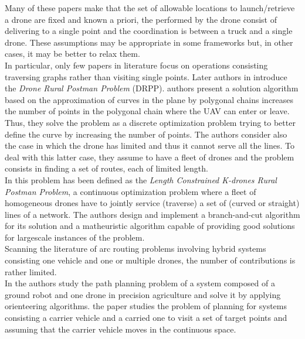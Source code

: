 \noindent
Many of these papers make  that the set of allowable locations to launch/retrieve a drone are fixed and known a priori, the  performed by the drone consist of delivering to a single point and the coordination is between a truck and a single drone. These assumptions may be appropriate in some frameworks\RE{,} but, in other cases, it may be better to relax them.\\
\noindent
In particular, only  few papers in  literature focus on  operations consisting  traversing graphs rather than visiting single points. Later authors in 
\cite{art:Campbell2018} introduce the \textit{Drone Rural Postman Problem} (DRPP).  authors present a solution algorithm based on the approximation of curves in the plane by polygonal chains  increases the number of points in the polygonal chain where the UAV can enter or leave. Thus, they solve the problem as a discrete optimization problem trying to better define the curve by increasing the number of points. The authors consider also the case in which the drone has limited  and thus it cannot serve all the lines. To deal with this latter case, they assume to have a fleet of drones and the problem consists in finding a set of routes, each of limited length.\\
In \cite{art:CAMPBELL202160}  this problem has been defined as the \textit{Length Constrained K-drones Rural Postman Problem}, a continuous optimization problem where a fleet of homogeneous drones have to jointly service (traverse) a set of (curved or straight) lines of a network. The authors design and implement a branch-and-cut algorithm for its solution and a matheuristic algorithm capable of providing good solutions for large\RE{-}scale instances of the problem.\\
Scanning the literature of arc routing problems involving hybrid systems consisting  one vehicle and one or multiple drones, the number of contributions is rather limited.\\
In \cite{art:Tokekar2016} the authors study the path planning problem of a system composed of a ground robot and one drone in precision agriculture and solve it by applying orienteering algorithms.  the paper \cite{art:Garone2010} studies the problem of  planning for systems consisting  a carrier vehicle and a carried one to visit a set of target points and assuming that the carrier vehicle moves in the continuous space.\\
